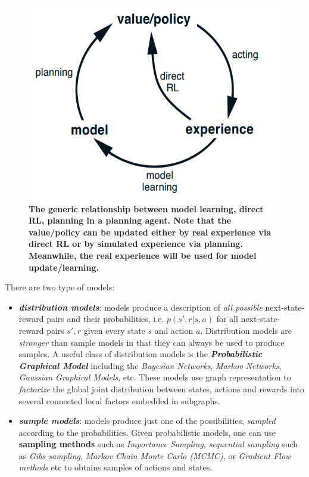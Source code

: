 \documentclass[11pt]{article}
\begin{document}
\begin{figure}
\begin{minipage}[t]{1\linewidth}
  \centering
  \centerline{\includegraphics[scale = 0.3]{Planning_learning_relationship.png}}
\end{minipage}
\caption{\footnotesize{\textbf{The generic relationship between model learning, direct RL, planning in a planning agent. Note that the value/policy can be updated either by real experience via direct RL or by simulated experience via planning. Meanwhile, the real experience will be used for model update/learning. }}}
\label{fig: Planning_learning_relationship}
\end{figure}
There are two type of models:
\begin{itemize}
\item \emph{\textbf{distribution models}}: models produce a description of \emph{all possible} next-state-reward pairs and their probabilities, i.e. $p(s', r| s, a)$ for all next-state-reward pairs $s', r$ given every state $s$ and action $a$. Distribution models are \emph{stronger} than sample models in that they can always be used to produce samples. A useful class of distribution models is the \textbf{\emph{Probabilistic Graphical Model}} \citep{koller2009probabilistic} including the \emph{Bayesian Networks}, \emph{Markov Networks}, \emph{Gaussian  Graphical Models}, etc. These models use graph representation to \emph{factorize} the global joint distribution between states, actions and rewards into several connected local factors embedded in subgraphs. 

\item \emph{\textbf{sample models}}:  models produce just one of the possibilities, \emph{sampled} according to the probabilities. Given probabilistic models, one can use \textbf{sampling methods} \citep{liu2001monte} such as \emph{Importance Sampling},  \emph{sequential sampling} such as \emph{Gibs sampling}, \emph{Markov Chain Monte Carlo (MCMC)}, or \emph{Gradient Flow methods} etc to obtains samples of actions and states. 
\end{itemize}
\end{document}
